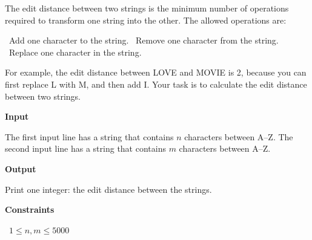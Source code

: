 The edit distance between two strings is the minimum number of operations required to transform one string into the other.
The allowed operations are:

\textbullet\ Add one character to the string.
\textbullet\ Remove one character from the string.
\textbullet\ Replace one character in the string.

For example, the edit distance between LOVE and MOVIE is 2, because you can first replace L with M, and then add I.
Your task is to calculate the edit distance between two strings.

\vspace{0.3cm}\noindent\textbf{Input}

The first input line has a string that contains $n$ characters between A–Z.
The second input line has a string that contains $m$ characters between A–Z.

\vspace{0.3cm}\noindent\textbf{Output}

Print one integer: the edit distance between the strings.

\vspace{0.3cm}\noindent\textbf{Constraints}

\textbullet\ $1 \le n,m \le 5000$